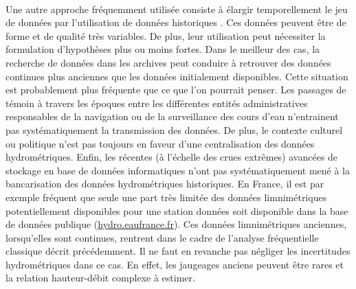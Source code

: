 \documentclass[11pt]{article}
\begin{document}
	\paragraph{} Une autre approche fréquemment utilisée consiste à élargir temporellement le jeu de données par l'utilisation de données historiques \citet{brazdil_historical_2006}. Ces données peuvent être de forme et de qualité très variables. De plus, leur utilisation peut nécessiter la formulation d'hypothèses plus ou moins fortes. Dans le meilleur des cas, la recherche de données dans les archives peut conduire à retrouver des données continues plus anciennes que les données initialement disponibles. Cette situation est probablement plus fréquente que ce que l'on pourrait penser. Les passages de témoin à travers les époques entre les différentes entités administratives responsables de la navigation ou de la surveillance des cours d'eau n'entrainent pas systématiquement la transmission des données. De plus, le contexte culturel ou politique n'est pas toujours en faveur d'une centralisation des données hydrométriques. Enfin, les récentes (à l'échelle des crues extrêmes) avancées de stockage en base de données informatiques n'ont pas systématiquement mené à la bancarisation des données hydrométriques historiques. En France, il est par exemple fréquent que seule une part très limitée des données limnimétriques potentiellement disponibles pour une station données soit disponible dans la base de données publique (\url{hydro.eaufrance.fr}). Ces données limnimétriques anciennes, lorsqu'elles sont continues, rentrent dans le cadre de l'analyse fréquentielle classique décrit précédemment. Il ne faut en revanche pas négliger les incertitudes hydrométriques dans ce cas. En effet, les jaugeages anciens peuvent être rares et la relation hauteur-débit complexe à estimer. 
	
\end{document}
